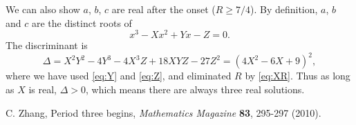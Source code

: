 \documentclass[twocolumn,prl]{revtex4-1}
\begin{document}
We can also show $a$, $b$, $c$ are real after the onset ($R\ge7/4$).
By definition, $a$, $b$ and $c$ are the distinct roots of
\[
  x^3 - X x^2 + Y x - Z = 0.
\]
The discriminant is
\[
\Delta = X^2 Y^2 - 4 Y^3 - 4 X^3 Z + 18 X Y Z - 27 Z^2
  = (4X^2 - 6X + 9)^2,
\]
where we have used \eqref{eq:Y} and \eqref{eq:Z},
and eliminated $R$ by \eqref{eq:XR}.
Thus as long as $X$ is real, $\Delta > 0$, which means there are always three
real solutions.

\begin{thebibliography}{}
 C. Zhang,
  Period three begins,
  \textit{Mathematics Magazine}
  \textbf{83},
  295-297
  (2010).
\end{thebibliography}
\end{document}
